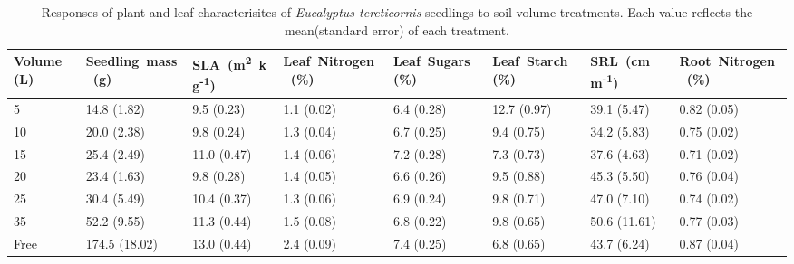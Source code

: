 \documentclass[a4paper]{article}\usepackage[]{graphicx}\usepackage[]{color}
\begin{document}
\begin{table}
\centering
\caption{Responses of plant and leaf characterisitcs of \textit{Eucalyptus tereticornis} seedlings to soil volume treatments. Each value reflects the mean(standard error) of each treatment.} 
\label{table:Table1}
\begin{tabular}{llllllll}
  \hline
Volume (L) & Seedling~mass~(g) & SLA~(m\textsuperscript{2}~kg\textsuperscript{-1}) & Leaf~Nitrogen~(\%) & Leaf~Sugars~(\%) & Leaf~Starch~(\%) & SRL~(cm~m\textsuperscript{-1}) & Root~Nitrogen~(\%) \\ 
  \hline
5 & 14.8 (1.82) & 9.5 (0.23) & 1.1 (0.02) & 6.4 (0.28) & 12.7 (0.97) & 39.1 (5.47) & 0.82 (0.05) \\ 
  10 & 20.0 (2.38) & 9.8 (0.24) & 1.3 (0.04) & 6.7 (0.25) & 9.4 (0.75) & 34.2 (5.83) & 0.75 (0.02) \\ 
  15 & 25.4 (2.49) & 11.0 (0.47) & 1.4 (0.06) & 7.2 (0.28) & 7.3 (0.73) & 37.6 (4.63) & 0.71 (0.02) \\ 
  20 & 23.4 (1.63) & 9.8 (0.28) & 1.4 (0.05) & 6.6 (0.26) & 9.5 (0.88) & 45.3 (5.50) & 0.76 (0.04) \\ 
  25 & 30.4 (5.49) & 10.4 (0.37) & 1.3 (0.06) & 6.9 (0.24) & 9.8 (0.71) & 47.0 (7.10) & 0.74 (0.02) \\ 
  35 & 52.2 (9.55) & 11.3 (0.44) & 1.5 (0.08) & 6.8 (0.22) & 9.8 (0.65) & 50.6 (11.61) & 0.77 (0.03) \\ 
  Free & 174.5 (18.02) & 13.0 (0.44) & 2.4 (0.09) & 7.4 (0.25) & 6.8 (0.65) & 43.7 (6.24) & 0.87 (0.04) \\ 
   \hline
\end{tabular}
\end{table}



\end{document}

